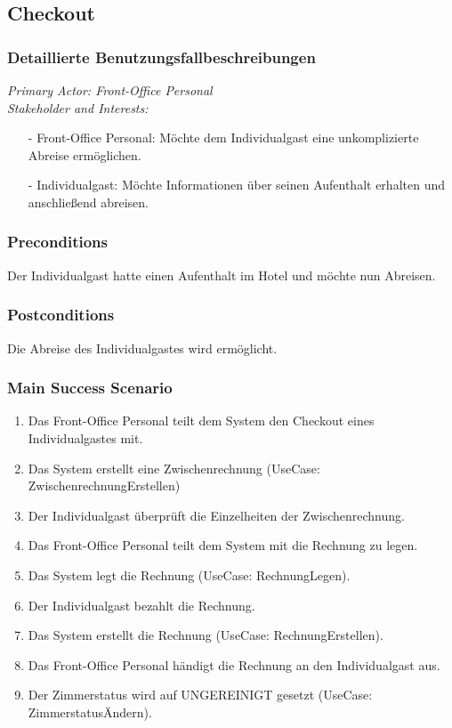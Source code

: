 \documentclass[./detailed_overview_usecases.tex]{subfiles}
\begin{document}
    \subsection{Checkout}
    \subsubsection{Detaillierte Benutzungsfallbeschreibungen}
    \textit{Primary Actor: Front-Office Personal}
    \\
    \textit{Stakeholder and Interests:}
    \begin{itemize}
        \item[-] Front-Office Personal: Möchte dem Individualgast eine unkomplizierte Abreise ermöglichen.
        \item[-] Individualgast: Möchte Informationen über seinen Aufenthalt erhalten und anschließend abreisen.
    \end{itemize}

    \subsubsection*{Preconditions}
    Der Individualgast hatte einen Aufenthalt im Hotel und möchte nun Abreisen.

    \subsubsection*{Postconditions}
    Die Abreise des Individualgastes wird ermöglicht.

    \subsubsection*{Main Success Scenario}
    \begin{enumerate}
        \item Das Front-Office Personal teilt dem System den Checkout eines Individualgastes mit.
        \item Das System erstellt eine Zwischenrechnung (UseCase: ZwischenrechnungErstellen)
        \item Der Individualgast überprüft die Einzelheiten der Zwischenrechnung.
        \item Das Front-Office Personal teilt dem System mit die Rechnung zu legen.
        \item Das System legt die Rechnung (UseCase: RechnungLegen).
        \item Der Individualgast bezahlt die Rechnung.
        \item Das System erstellt die Rechnung (UseCase: RechnungErstellen).
        \item Das Front-Office Personal händigt die Rechnung an den Individualgast aus.
        \item Der Zimmerstatus wird auf UNGEREINIGT gesetzt (UseCase: ZimmerstatusÄndern).
    \end{enumerate}
\end{document}
